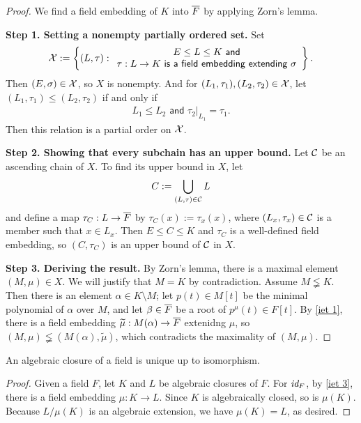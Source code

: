 \begin{proof}
    We find a field embedding of $K$ into $\overline{F}$ by applying Zorn's lemma.

    \textbf{Step 1. Setting a nonempty partially ordered set.}\newline\noindent
    Set
    \begin{align*}
        {\mathcal{X}}:=\left\{(L, \tau):
        \begin{array}{c}
            E\leq L\leq K\textsf{ and}\\
            \tau: L\rightarrow K\textsf{ is a field embedding extending }\sigma
        \end{array}
        \right\}.
    \end{align*}
    Then $(E, \sigma)\in {\mathcal{X}}$, so $X$ is nonempty.
    And for $(L_1, \tau_1), (L_2, \tau_2)\in {\mathcal{X}}$, let $(L_1, \tau_1)\leq(L_2, \tau_2)$ if and only if
    \begin{align*}
        L_1\leq L_2\textsf{ and } \tau_2|_{L_1}=\tau_1.
    \end{align*}
    \color{brown}Then this relation is a partial order on ${\mathcal{X}}$.\color{black}

    \textbf{Step 2. Showing that every subchain has an upper bound.}\newline\noindent
    Let ${\mathcal{C}}$ be an ascending chain of $X$.
    To find its upper bound in $X$, let
    \begin{align*}
        C:=\bigcup_{(L, \tau)\in {\mathcal{C}}} L
    \end{align*}
    and define a map $\tau_C: L\rightarrow \overline{F}$ by $\tau_C(x):=\tau_x(x)$, where $(L_x, \tau_x)\in{\mathcal{C}}$ is a member such that $x\in L_x$.
    \color{brown}Then $E\leq C\leq K$ and $\tau_C$ is a well-defined field embedding, \color{black}so $(C, \tau_C)$ is an upper bound of ${\mathcal{C}}$ in $X$.

    \textbf{Step 3. Deriving the result.}\newline\noindent
    By Zorn's lemma, there is a maximal element $(M, \mu)\in X$.
    We will justify that $M=K$ by contradiction.
    Assume $M\lneqq K$.
    Then there is an element $\alpha\in K\setminus M$; let $p(t)\in M[t]$ be the minimal polynomial of $\alpha$ over $M$, and let $\beta\in \overline{F}$ be a root of $p^\mu(t)\in F[t]$.
    By \cref{iet 1}, there is a field embedding $\widetilde{\mu}: M(\alpha)\rightarrow\overline{F}$ extenidng $\mu$, so $(M, \mu)\lneqq(M(\alpha), \widetilde{\mu})$, which contradicts the maximality of $(M, \mu)$.
\end{proof}
\begin{cor}
    An algebraic closure of a field is unique up to isomorphism.
\end{cor}
\begin{proof}
    Given a field $F$, let $K$ and $L$ be algebraic closures of $F$.
    For $\textit{id}_{F}$, by \cref{iet 3}, there is a field embedding $\mu: K\rightarrow L$.
    Since $K$ is algebraically closed, so is $\mu(K)$.
    Because $L/\mu(K)$ is an algebraic extension, we have $\mu(K)=L$, as desired.
\end{proof}